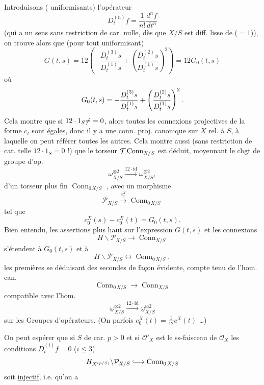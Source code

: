 Introduisons (   uniformisants) l'opérateur
\[
D_t^{(n)}f=\frac1{n!}\frac{d^nf}{dt^n}
\]
(qui a un sens sans restriction de car. nulle, dès que $X/S$ est diff. lisse de   ($=1$)), on trouve alors que (pour tout uniformisant)
\[
G(t,s)=12\left(-\frac{D_t^{(3)}s}{D_t^{(1)}s}+\left(\frac{D_t^{(2)}s}{D_t^{(1)}s}\right)^2\right)=12G_0(t,s)
\]
où
\[
G_0(t,s)=-\frac{D_t^{(3)}s}{{D_t^{(1)}}s}+\left(\frac{D_t^{(2)}s}{{D_t^{(1)}}s}\right)^2.
\]
Cela montre que si $12\cdot1_S{{\ne}}=0$, alors toutes les connexions projectives de la forme $c_t$ sont \uline{égales}, donc il y a une conn. proj. canonique sur $X$ rel. à $S$, à laquelle on peut référer toutes les autres. Cela montre aussi (sans restriction de car. telle $12\cdot1_S=0$ !) que le torseur ${{\mathcal T}}\operatorname{Conn}_{X/S}$ est déduit, moyennant le chgt de groupe d'op.
\[
\underline\omega_{X/S}^{\otimes2}\xrightarrow{12\cdot\mathrm{id}}\underline\omega_{X/S}^{\otimes2},
\]
d'un torseur plus fin $\operatorname{Conn}_{0\,X/S}$ , avec un morphisme
\[
\mathcal P_{X/S}\xrightarrow{c_0^X}\operatorname{Conn}_{0\,X/S}
\]
tel que
\[
c_0^X(s)-c_0^X(t)=G_0(t,s).
\]
Bien entendu, les assertions plus haut sur l'expression $G(t,s)$ et les connexions
\[
H\backslash\mathcal P_{X/S}\longrightarrow\operatorname{Conn}_{X/S}
\]
s'étendent à $G_0(t,s)$ et à
\[
H\backslash\mathcal P_{X/S}\longleftrightarrow\operatorname{Conn}_{0\,X/S},
\]
les premières se déduisant des secondes de façon évidente, compte tenu de l'hom. can.
\[
\operatorname{Conn}_{0\,X/S}\longrightarrow\operatorname{Conn}_{X/S}
\]
compatible avec l'hom.
\[
\underline\omega_{X/S}^{\otimes2}\xrightarrow{12\cdot\mathrm{id}}\underline\omega_{X/S}^{\otimes2}
\]
sur les Groupes d'opérateurs. (On   parfois $c_0^X(t)=\frac1{12}c^X(t)$ \ldots)

On peut espérer que si $S$ de car. $p>0$ et si $\mathcal O'_X$ est le ss-faisceau de $\mathcal O_X$   les conditions $D_t^{(i)}f=0$ ($i\le3$)
\[
H_{X^{(p/S)}}\backslash\mathcal P_{X/S}\lhook\joinrel\longrightarrow\operatorname{Conn}_{0\,X/S}
\]
soit \uline{injectif}, i.e. qu'on a

